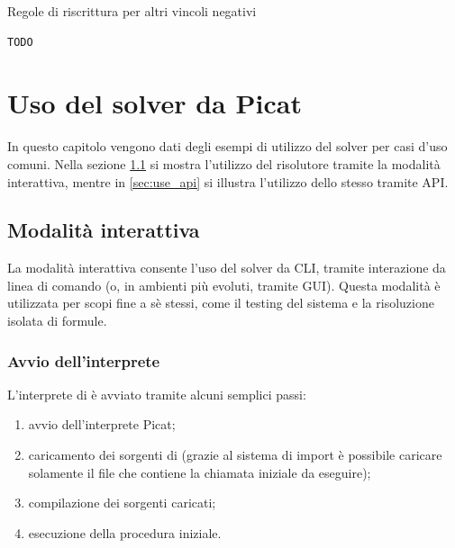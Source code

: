 \documentclass[12pt,a4paper,openright]{book}  %
\begin{document}
\begin{algorithm}[H]
	\caption{Regole di riscrittura per altri vincoli negativi}
	\label{alg:othernegatives_constraints}
\end{algorithm}
\begin{verbatim}
TODO
\end{verbatim}



\chapter{Uso del solver \lset{} da Picat}
\label{ch:use}


In questo capitolo vengono dati degli esempi di utilizzo del solver per
casi d'uso comuni. Nella sezione \ref{sec:use_interactive} si mostra
l'utilizzo del risolutore tramite la modalità interattiva, mentre in
\ref{sec:use_api} si illustra l'utilizzo dello stesso tramite API.

\section{Modalità interattiva}
\label{sec:use_interactive}

La modalità interattiva consente l'uso del solver da CLI, tramite
interazione da linea di comando (o, in ambienti più evoluti, tramite
GUI). Questa modalità è utilizzata per scopi fine a sè stessi, come il
testing del sistema e la risoluzione isolata di formule.

\subsection{Avvio dell'interprete}

L'interprete di \lset{} è avviato tramite alcuni semplici passi:
\begin{enumerate}
	\item avvio dell'interprete Picat;
	\item caricamento dei sorgenti di \lset{} (grazie al sistema
          di import è possibile caricare solamente il file che
          contiene la chiamata iniziale da eseguire);
	\item compilazione dei sorgenti caricati;
	\item esecuzione della procedura iniziale.
\end{enumerate}
\end{document}
